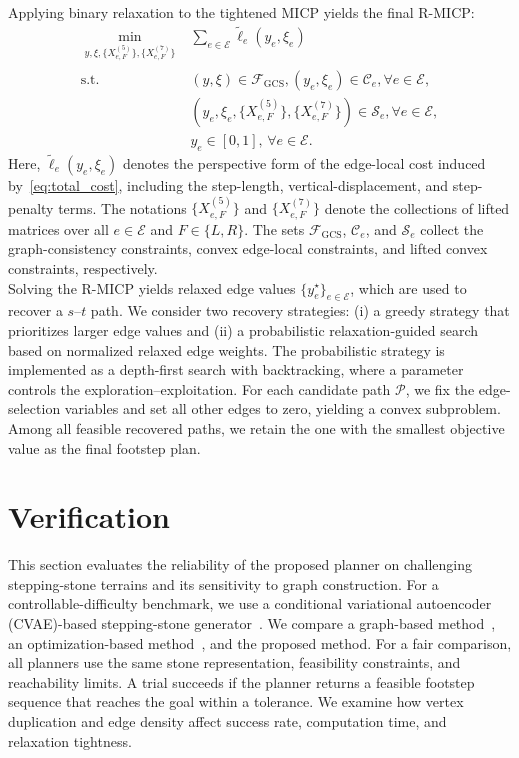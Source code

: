 \documentclass[letterpaper, 10 pt, journal, twoside]{IEEEtran}
\begin{document}
Applying binary relaxation to the tightened MICP yields the final R-MICP:
\begin{equation}
\label{eq:rmicp_compact_revised}
\begin{aligned}
\min_{\substack{y,\xi,\{X_{e,F}^{(5)}\},\{X_{e,F}^{(7)}\}}} \!
& \sum_{e\in\mathcal E} \tilde{\ell}_e(y_e,\xi_e) \\
\text{s.t.}\,
& (y,\xi)\in \mathcal F_{\mathrm{GCS}}, \! (y_e,\xi_e)\in \mathcal C_e, \! \forall e\in\mathcal E, \\
& (y_e,\xi_e,\{X_{e,F}^{(5)}\},\{X_{e,F}^{(7)}\})\in \mathcal S_e,
\! \forall e\in\mathcal E, \\
& y_e \in [0,1], \, \forall e\in\mathcal E .
\end{aligned}
\end{equation}
Here, $\tilde{\ell}_e(y_e,\xi_e)$ denotes the perspective form of the edge-local cost induced by~\eqref{eq:total_cost}, including the step-length, vertical-displacement, and step-penalty terms.
The notations \(\{X_{e,F}^{(5)}\}\) and \(\{X_{e,F}^{(7)}\}\) denote the collections of lifted matrices over all \(e\in\mathcal E\) and \(F\in\{L,R\}\).
The sets $\mathcal F_{\mathrm{GCS}}$, $\mathcal C_e$, and $\mathcal S_e$ collect the graph-consistency constraints, convex edge-local constraints, and lifted convex constraints, respectively.
\\
\indent
Solving the R-MICP yields relaxed edge values $\{y_e^\star\}_{e\in\mathcal E}$, which are used to recover a $s$--$t$ path.
We consider two recovery strategies: (i) a greedy strategy that prioritizes larger edge values and (ii) a probabilistic relaxation-guided search based on normalized relaxed edge weights.
The probabilistic strategy is implemented as a depth-first search with backtracking, where a parameter controls the exploration--exploitation.
For each candidate path $\mathcal P$, we fix the edge-selection variables and set all other edges to zero, yielding a convex subproblem.
Among all feasible recovered paths, we retain the one with the smallest objective value as the final footstep plan.

\section{Verification}

This section evaluates the reliability of the proposed planner on challenging stepping-stone terrains and its sensitivity to graph construction.
For a controllable-difficulty benchmark, we use a conditional variational autoencoder (CVAE)-based stepping-stone generator~\cite{kim2025high}.
We compare a graph-based method~\cite{griffin2019footstep}, an optimization-based method~\cite{deits2014footstep}, and the proposed method.
For a fair comparison, all planners use the same stone representation, feasibility constraints, and reachability limits.
A trial succeeds if the planner returns a feasible footstep sequence that reaches the goal within a tolerance.
We examine how vertex duplication and edge density affect success rate, computation time, and relaxation tightness.
\end{document}
